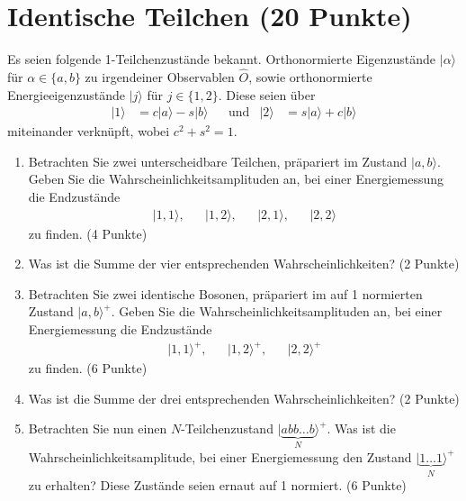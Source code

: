 \documentclass[german, parskip=full]{scrartcl}
\newcommand{\tecxt}{}
\newcommand{\Ket}{}
\begin{document}
\section{Identische Teilchen (20 Punkte)}
Es seien folgende 1-Teilchenzustände bekannt.
Orthonormierte Eigenzustände $\Ket | {\alpha} \rangle$ für $\alpha\in\{a,b\}$ zu irgendeiner Observablen $\hat{O}$, sowie orthonormierte Energieeigenzustände $\Ket | {j} \rangle$ für $j\in\{1,2\}$.
Diese seien über
\begin{align}
\Ket | {1} \rangle&=c\Ket | {a} \rangle-s\Ket | {b} \rangle&&\tecxt\text{und}&\Ket | {2} \rangle&=s\Ket | {a} \rangle+c\Ket | {b} \rangle
\end{align}
miteinander verknüpft, wobei $c^2+s^2=1$.
\begin{enumerate}
\item[a)] Betrachten Sie zwei unterscheidbare Teilchen, präpariert im Zustand $|a,b\rangle$. 
Geben Sie die Wahrscheinlichkeitsamplituden an, bei einer Energiemessung die Endzustände
\begin{align}
\Ket | {1,1} \rangle,&&\Ket | {1,2} \rangle,&&\Ket | {2,1} \rangle,&&\Ket | {2,2} \rangle
\end{align}
zu finden. (4 Punkte)
\item[b)] Was ist die Summe der vier entsprechenden Wahrscheinlichkeiten? (2 Punkte)
\item[c)] Betrachten Sie zwei identische Bosonen, präpariert im auf 1 normierten Zustand $\Ket | {a,b} \rangle^+$. 
Geben Sie die Wahrscheinlichkeitsamplituden an, bei einer Energiemessung die Endzustände
\begin{align}
\Ket | {1,1} \rangle^+,&&\Ket | {1,2} \rangle^+,&&\Ket | {2,2} \rangle^+
\end{align}
zu finden. (6 Punkte)
\item[d)] Was ist die Summe der drei entsprechenden Wahrscheinlichkeiten? (2 Punkte)
\item[e)] Betrachten Sie nun einen $N$-Teilchenzustand $\Ket | {\underbrace{abb\dots b}_N} \rangle^+$. 
Was ist die Wahrscheinlichkeitsamplitude, bei einer Energiemessung den Zustand $\Ket | {\underbrace{1\dots 1}_N} \rangle^+$ zu erhalten? 
Diese Zustände seien ernaut auf 1 normiert. (6 Punkte)
\end{enumerate}
\newpage
\end{document}

